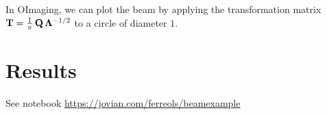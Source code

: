 \documentclass[a4paper,11pt,twoside]{scrartcl}
\begin{document}
In OImaging, we can plot the  beam by  applying  the transformation matrix $\mathbf{T} = \frac{1}{\pi}\, \mathbf{Q}\,\mathbf{\Lambda}^{-1/2} $ to a circle of diameter $1$.


\section{Results}

See notebook \url{https://jovian.com/ferreols/beamexample} 
\end{document}
